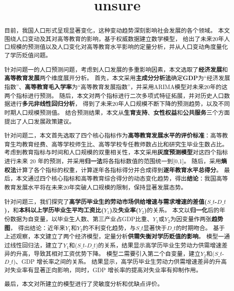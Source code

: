 \documentclass[withoutpreface,bwprint]{cumcmthesis} %
\title{unsure}
\begin{document}
\maketitle
\begin{abstract}

目前，我国人口形式呈现显著变化，这种变动趋势深刻影响社会发展的各个领域。
本文围绕人口变动及其对高等教育的影响，基于权威数据建立数学模型，
给出了未来20年人口规模的预测值以及人口变化对高等教育水平影响的定量分析，并从人口变动角度量化了学历贬值问题。

针对问题一的人口预测问题，考虑到人口发展的多重影响因素，本文选取了\textbf{经济发展}和\textbf{高等教育发展}两个维度展开分析。
首先，本文采用\textbf{主成分分析法}确定\textbf{GDP}为“经济发展指数”、\textbf{高等教育毛入学率}为“高等教育发展指数”，并采用ARIMA模型对未来20年的这两个指标进行预测。
随后，本文对两个指标进行二次多项式特征拓展，并对历史人口数据进行\textbf{多元非线性回归分析}，
得到了未来20年人口规模不断下降的预测趋势，以及不同时期人口规模预测值。
结合预测结果，本文从\textbf{生育支持}、\textbf{女性权益}和\textbf{公共服务}三个方面提出了人口发展政策建议。

针对问题二，本文首先选取了四个核心指标作为\textbf{高等教育发展水平的评价标准}：高等教育生均教育经费、高等学校师生比、高等学校专任教师数占比和研究生毕业生数占比。
考虑到教育指标与时间和人口规模的双重相关性，本文采用\textbf{灰度预测模型}对这四个指标进行未来 20 年的预测，并采用\textbf{归一法}将各指标数值的范围统一到[0,1]。
随后，采用\textbf{熵权法}计算了各个指标的权重，计算逐年各指标得分并合成得到\textbf{逐年教育水平总得分}。
最后，本文通过四个核心指标和高等教育综合得分的动态变化趋势，得出\textbf{结论}：我国高等教育发展水平将在未来20年突破人口规模的限制，保持显著发展态势。

针对问题三，我们探究了\textbf{高学历毕业生的劳动市场供给增速与需求增速的差值($S\_{t}$-$D\_{t}$)}，和\textbf{本科以上学历毕业生平均工资比($Y_1$)}及\textbf{失业率($Y_2$)}的关系。
本文以\textbf{归一化}后的年份数据为自变量，以毕业生人数、第三产业占GDP比重、$Y_1$或$Y_2$为因变量作两张\textbf{趋势图}，
得出结论：近年来$Y_1$和$Y_2$的不利变化趋势，与$S\_{t}$显著快于$D\_{t}$的时期吻合。
基于上述观察，本文建立了两个经济模型，定量分析\textbf{供需失衡对学历贬值的影响}。
模型一通过线性回归法，建立了$Y_1$和($S\_{t}$-$D\_{t}$)的关系，结果显示高学历毕业生劳动力供需增速差异的升高，导致其相对工资优势下降。
模型二需要引入第二个自变量，建立$Y_2$和($S\_{t}$-$D\_{t}$)、GDP 增长率之间的关系。
结果显示，高学历毕业生劳动力供需增速差异的升高对失业率有显著正向影响，同时，GDP 增长率的提高对失业率有抑制作用。

最后，本文对所建立的模型进行了灵敏度分析和优缺点评价。


\end{abstract}
\end{document}
